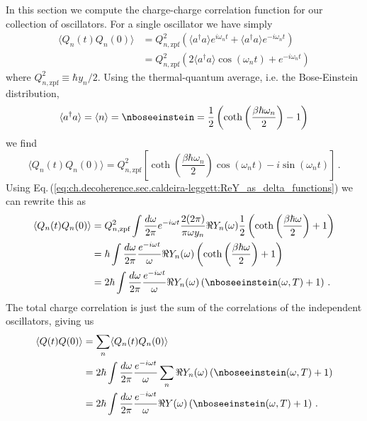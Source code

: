 
In this section we compute the charge-charge correlation function for our collection of oscillators.
For a single oscillator we have simply
\begin{align}
  \langle Q_n(t) Q_n(0) \rangle
  &= Q_{n,\text{zpf}}^2 \left( \langle a^\dagger a \rangle e^{i \omega_n t} + \langle a^\dagger a \rangle e^{-i \omega_n t} \right) \nonumber \\
  &= Q_{n,\text{zpf}}^2 \left( 2\langle a^\dagger a \rangle \cos(\omega_n t) + e^{-i \omega_n t} \right)
\end{align}
where $Q_{n,\text{zpf}}^2 \equiv \hbar y_n / 2$.
Using the thermal-quantum average, i.e. the Bose-Einstein distribution,
\begin{equation}
  \langle a^\dagger a \rangle = \langle n \rangle = \nboseeinstein = \frac{1}{2} \left( \coth \left( \frac{\beta \hbar \omega_n}{2} \right) - 1 \right)
\end{equation}
we find
\begin{equation}
\langle Q_n(t) Q_n(0) \rangle
= Q_{n,\text{zpf}}^2 \left[ \coth \left( \frac{\beta \hbar \omega_n}{2} \right) \cos(\omega_n t) -i \sin ( \omega_n t) \right] \, .
\end{equation}
Using Eq.\,(\ref{eq:ch.decoherence.sec.caldeira-leggett:ReY_as_delta_functions}) we can rewrite this as
\begin{align}
  \langle Q_n(t) Q_n(0) \rangle
  &= Q_{n,\text{zpf}}^2
  \int \frac{d\omega}{2 \pi} e^{-i \omega t} \frac{2 (2\pi)}{\pi \omega y_n} \Re Y_n(\omega) \frac{1}{2} \left( \coth \left( \frac{\beta \hbar \omega}{2} \right) + 1 \right) \nonumber \\
  &= \hbar \int \frac{d\omega}{2 \pi} \frac{e^{-i \omega t}}{\omega} \Re Y_n (\omega) \left( \coth \left( \frac{\beta \hbar \omega}{2} \right) + 1 \right) \nonumber \\
  &= 2 \hbar \int \frac{d\omega}{2 \pi} \frac{e^{-i \omega t}}{\omega} \Re Y_n (\omega) \left( \nboseeinstein(\omega, T) + 1 \right)
  \, .
\end{align}
The total charge correlation is just the sum of the correlations of the independent oscillators, giving us
\begin{align}
  \langle Q(t) Q(0) \rangle
  &= \sum_n \langle Q_n(t) Q_n(0) \rangle \nonumber \\
  &= 2 \hbar \int \frac{d\omega}{2 \pi} \frac{e^{-i \omega t}}{\omega} \sum_n \Re Y_n (\omega) \left( \nboseeinstein(\omega, T) + 1 \right) \nonumber \\
  &= 2 \hbar \int \frac{d\omega}{2 \pi} \frac{e^{-i \omega t}}{\omega} \Re Y(\omega) \left( \nboseeinstein(\omega, T) + 1 \right)
  \, .
  \end{align}
